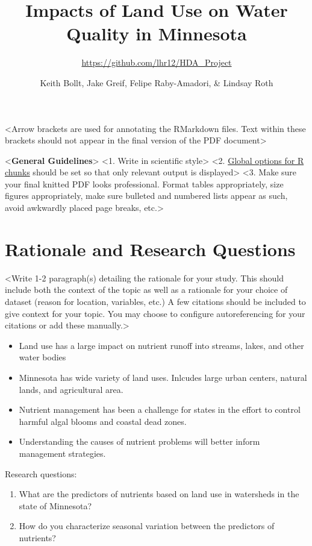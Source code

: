 \documentclass[12pt,]{article}
\title{Impacts of Land Use on Water Quality in Minnesota}
\subtitle{\url{https://github.com/lhr12/HDA_Project}}
\author{Keith Bollt, Jake Greif, Felipe Raby-Amadori, \& Lindsay Roth}
\date{}
\providecommand{\tightlist}{%
  \setlength{\itemsep}{0pt}\setlength{\parskip}{0pt}}
\begin{document}
\maketitle

\newpage

\textless Arrow brackets are used for annotating the RMarkdown files.
Text within these brackets should not appear in the final version of the
PDF document\textgreater{}

\textless{}\textbf{General Guidelines}\textgreater{} \textless1. Write
in scientific style\textgreater{} \textless2.
\href{https://rmarkdown.rstudio.com/lesson-3.html}{Global options for R
chunks} should be set so that only relevant output is
displayed\textgreater{} \textless3. Make sure your final knitted PDF
looks professional. Format tables appropriately, size figures
appropriately, make sure bulleted and numbered lists appear as such,
avoid awkwardly placed page breaks, etc.\textgreater{}

\hypertarget{rationale-and-research-questions}{%
\section{Rationale and Research
Questions}\label{rationale-and-research-questions}}

\textless Write 1-2 paragraph(s) detailing the rationale for your study.
This should include both the context of the topic as well as a rationale
for your choice of dataset (reason for location, variables, etc.) A few
citations should be included to give context for your topic. You may
choose to configure autoreferencing for your citations or add these
manually.\textgreater{}

\begin{itemize}
\tightlist
\item
  Land use has a large impact on nutrient runoff into streams, lakes,
  and other water bodies
\item
  Minnesota has wide variety of land uses. Inlcudes large urban centers,
  natural lands, and agricultural area.
\item
  Nutrient management has been a challenge for states in the effort to
  control harmful algal blooms and coastal dead zones.
\item
  Understanding the causes of nutrient problems will better inform
  management strategies.
\end{itemize}

Research questions:

\begin{enumerate}
\def\labelenumi{\arabic{enumi}.}
\item
  What are the predictors of nutrients based on land use in watersheds
  in the state of Minnesota?
\item
  How do you characterize seasonal variation between the predictors of
  nutrients?
\end{enumerate}
\end{document}
